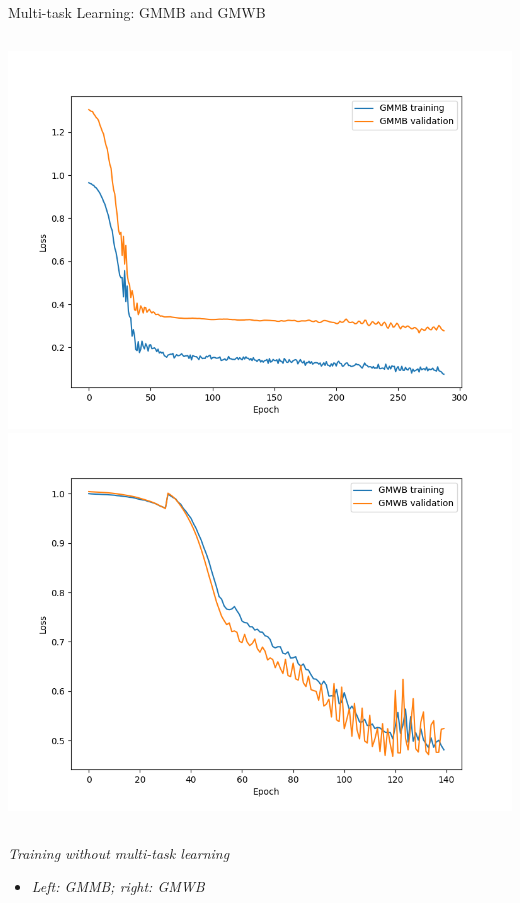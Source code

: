 \documentclass[9pt,handout]{beamer}
\begin{document}
    \begin{frame}{Multi-task Learning: GMMB and GMWB}
    \begin{columns}
    \includegraphics[height=0.8\textheight]{../project3/figures/figure5c.png}
    \includegraphics[height=0.8\textheight]{../project3/figures/figure5d.png}
    \end{columns}
    
    \textit{Training without multi-task learning}
    \begin{itemize}
        \item \textit{Left: GMMB; right: GMWB}
    \end{itemize}
    \end{frame}
    
\end{document}

